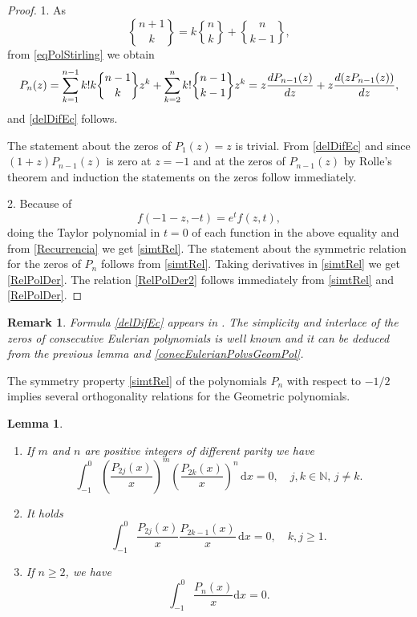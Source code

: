 \documentclass[11pt]{article}
\newtheorem{lemma}{Lemma}
\newtheorem{rem}{Remark}
\newcommand{\N}{\mathbb{N}}
\newcommand{\dd}{\mathrm{d}}
\DeclareRobustCommand{\stirling}{\genfrac\{\}{0pt}{}}
\begin{document}
\begin{proof} 1. As
\[
\stirling{n+1}{k}=k\stirling{n}{k}+\stirling{n}{k-1},
\]
from \eqref{eqPolStirling} we obtain
\[
P_n(z)=\sum_{k=1}^{n-1}k!k\stirling{n-1}{k}z^k+\sum_{k=2}^{n}k!\stirling{n-1}{k-1}z^k\\=z\frac{dP_{n-1}(z)}{dz}+z\frac{d(zP_{n-1}(z))}{dz},
\]
and \eqref{delDifEc} follows.

The statement about the zeros of $P_1(z)=z$ is trivial. From \eqref{delDifEc} and since $(1+z)P_{n-1}(z)$ is zero at $z=-1$ and at the zeros of $P_{n-1}(z)$ by Rolle's theorem and induction the statements on the zeros follow immediately. 

2. Because of
\[
f(-1-z,-t)=e^{t}f(z,t),
\]
doing the Taylor polynomial in $t=0$ of each function in the  above equality and from \eqref{Recurrencia} we get \eqref{simtRel}. The statement about the symmetric relation for the zeros of $P_n$ follows from \eqref{simtRel}. 
Taking derivatives in \eqref{simtRel} we get \eqref{RelPolDer}. The relation \eqref{RelPolDer2} follows immediately from \eqref{simtRel} and \eqref{RelPolDer}.
\end{proof}

\begin{rem} Formula \eqref{delDifEc} appears in \cite{Dil_Kur}. The simplicity and interlace of the zeros of consecutive Eulerian polynomials is well known \cite{SavVis} and it can be deduced from the previous lemma and \eqref{conecEulerianPolvsGeomPol}.


\end{rem}

The symmetry property \eqref{simtRel} of the polynomials $P_n$ with respect to $-1/2$ implies several orthogonality relations for the Geometric polynomials.



\begin{lemma}  \label{lemOrt1} 
\begin{enumerate}
\item If $m$ and $n$ are positive integers of different parity we have
\[
\int_{-1}^0\left(\frac{P_{2j}(x)}{x}\right)^m\left(\frac{P_{2k}(x)}{x}\right)^n\, \dd x=0,\quad j,k\in\N,\, j\ne k.
\]
\item It holds
\[
\int_{-1}^0\frac{P_{2j}(x)}{x}\frac{P_{2k-1}(x)}{x}\, \dd x=0,\quad k,j\ge 1.
\]
\item If $n\ge 2$, we have
\begin{equation}
\label{ort1}
\int_{-1}^0\frac{P_n(x)}{x}\dd x=0.
\end{equation}
\end{enumerate} 
\end{lemma}
\end{document}
